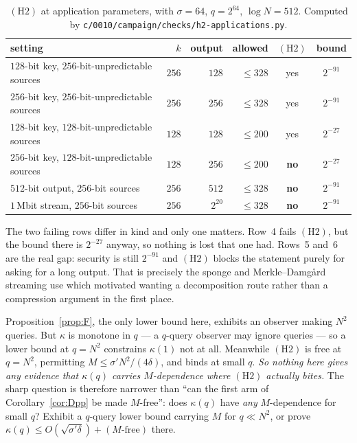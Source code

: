 \documentclass{aicr-solution}
\begin{document}
\begin{table}[t]
\centering\small
\begin{tabular}{lrrrcc}
\toprule
setting & $k$ & output & allowed & $(\mathrm{H2})$ & bound \\
\midrule
$128$-bit key, $256$-bit-unpredictable sources & $256$ & $128$ & $\le 328$ & yes & $2^{-91}$ \\
$256$-bit key, $256$-bit-unpredictable sources & $256$ & $256$ & $\le 328$ & yes & $2^{-91}$ \\
$128$-bit key, $128$-bit-unpredictable sources & $128$ & $128$ & $\le 200$ & yes & $2^{-27}$ \\
$256$-bit key, $128$-bit-unpredictable sources & $128$ & $256$ & $\le 200$ & \textbf{no} & $2^{-27}$ \\
$512$-bit output, $256$-bit sources & $256$ & $512$ & $\le 328$ & \textbf{no} & $2^{-91}$ \\
$1$\,Mbit stream, $256$-bit sources & $256$ & $2^{20}$ & $\le 328$ & \textbf{no} & $2^{-91}$ \\
\bottomrule
\end{tabular}
\caption{$(\mathrm{H2})$ at application parameters, with $\sigma = 64$,
  $q = 2^{64}$, $\log N = 512$. Computed by
  \texttt{c/0010/campaign/checks/h2-applications.py}.}
\end{table}

The two failing rows differ in kind and only one matters. Row~4 fails
$(\mathrm{H2})$, but the bound there is $2^{-27}$ anyway, so nothing is lost that
one had. Rows~5 and~6 are the real gap: security is still $2^{-91}$ and
$(\mathrm{H2})$ blocks the statement purely for asking for a long output. That is
precisely the sponge and Merkle--Damg\aa{}rd streaming use which motivated wanting a
decomposition route rather than a compression argument in the first place.

\begin{remark}\label{rem:h2gap}
Proposition~\ref{prop:F}, the only lower bound here, exhibits an observer making
$N^{2}$ queries. But $\kappa$ is monotone in $q$ --- a $q$-query observer may
ignore queries --- so a lower bound at $q = N^{2}$ constrains $\kappa(1)$ not at
all. Meanwhile $(\mathrm{H2})$ is free at $q = N^{2}$, permitting
$M \le \sigma' N^{2}/(4\delta)$, and binds at small $q$. \emph{So nothing here
gives any evidence that $\kappa(q)$ carries $M$-dependence where $(\mathrm{H2})$
actually bites.} The sharp question is therefore narrower than ``can the first arm
of Corollary~\ref{cor:Dpp} be made $M$-free'': does $\kappa(q)$ have \emph{any}
$M$-dependence for small $q$? Exhibit a $q$-query lower bound carrying $M$ for
$q \ll N^{2}$, or prove $\kappa(q) \le O(\sqrt{\sigma'\delta}) + (M\text{-free})$
there.
\end{remark}
\end{document}

